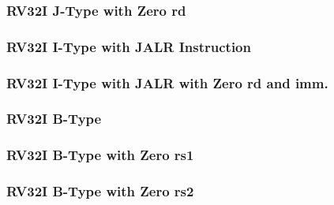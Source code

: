 

\subsubsection[{\small RV32I J-Type with Zero rd}]{RV32I J-Type with Zero rd} \label{sec:format-RV32I-JTypeZD}



\subsubsection[{\small RV32I I-Type with JALR Instruction}]{RV32I I-Type with JALR Instruction} \label{sec:format-RV32I-JALR}



\subsubsection[{\small RV32I I-Type with JALR with Zero rd and imm.}]{RV32I I-Type with JALR with Zero rd and imm.} \label{sec:format-RV32I-JALRZDI}



\subsubsection[{\small RV32I B-Type}]{RV32I B-Type} \label{sec:format-RV32I-BType}



\subsubsection[{\small RV32I B-Type with Zero rs1}]{RV32I B-Type with Zero rs1} \label{sec:format-RV32I-BTypeZ1}



\subsubsection[{\small RV32I B-Type with Zero rs2}]{RV32I B-Type with Zero rs2} \label{sec:format-RV32I-BTypeZ2}

